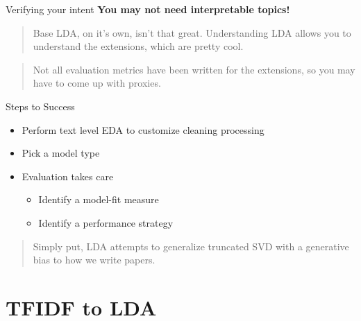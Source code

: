 \documentclass[10pt]{beamer}
\begin{document}
\begin{frame}{Verifying your intent}
  {\bf You may not need interpretable topics!}

  \begin{quote}
    Base LDA, on it's own, isn't that great. Understanding LDA allows you to understand the extensions, which are pretty cool.
  \end{quote}

  \vspace{2em}

  \begin{quote}
    Not all evaluation metrics have been written for the extensions, so you may have to come up with proxies.
  \end{quote}

\end{frame}


\begin{frame}{Steps to Success}

\begin{itemize}
\item Perform text level EDA to customize cleaning processing
\item Pick a model type
\item Evaluation takes care
  \begin{itemize}
  \item Identify a model-fit measure
  \item Identify a performance strategy
  \end{itemize}
\end{itemize}

\vspace{2em}

\begin{quote}
Simply put, LDA attempts to generalize truncated SVD with a generative bias to how we write papers.
\end{quote}
\end{frame}

\section{TFIDF to LDA}
\end{document}
